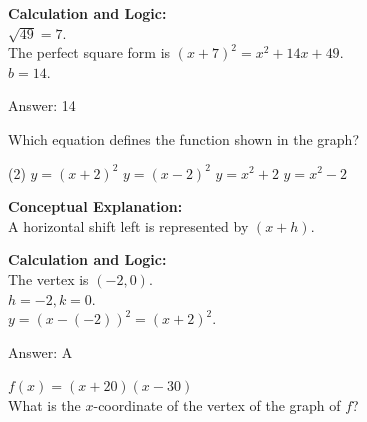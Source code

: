 \documentclass[11pt,paper=a4,answers]{exam}
\begin{document}
\begin{questions}
\begin{solution}
\vspace{20pt}

\textbf{Calculation and Logic:} \\
$\sqrt{49} = 7$. \\
The perfect square form is $(x+7)^2 = x^2 + 14x + 49$. \\
$b = 14$.

\vspace{25pt}

Answer: \colorbox{yellow!100}{14}
\end{solution}

\vspace{40pt}

\question
\begin{center}
\end{center}
Which equation defines the function shown in the graph?
\begin{tasks}(2)
    \task $y = (x+2)^2$
    \task $y = (x-2)^2$
    \task $y = x^2 + 2$
    \task $y = x^2 - 2$
\end{tasks}

\begin{solution}
\textbf{Conceptual Explanation:} \\
A horizontal shift left is represented by $(x+h)$.

\vspace{20pt}

\textbf{Calculation and Logic:} \\
The vertex is $(-2, 0)$. \\
$h = -2, k = 0$. \\
$y = (x - (-2))^2 = (x+2)^2$.

\vspace{25pt}

Answer: \colorbox{yellow!100}{A}
\end{solution}

\vspace{40pt}

\question
$f(x) = (x+20)(x-30)$ \\
What is the $x$-coordinate of the vertex of the graph of $f$?


\end{questions}
\end{document}
